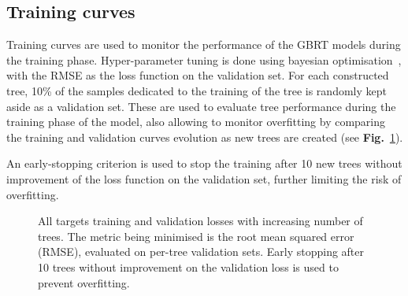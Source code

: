 \subsection{Training curves}
Training curves are used to monitor the performance of the GBRT models during the training phase. Hyper-parameter tuning is done using bayesian optimisation~\cite{Akiba2019}, with the RMSE as the loss function on the validation set. For each constructed tree, 10\% of the samples dedicated to the training of the tree is randomly kept aside as a validation set. These are used to evaluate tree performance during the training phase of the model, also allowing to monitor overfitting by comparing the training and validation curves evolution as new trees are created (see \textbf{Fig.}~\ref{fig:all_losses_curves}). 

An early-stopping criterion is used to stop the training after 10 new trees without improvement of the loss function on the validation set, further limiting the risk of overfitting.
\begin{figure}[ht]
\centering
{}
\caption{All targets training and validation losses with increasing number of trees. The metric being minimised is  the root mean squared error (RMSE), evaluated on per-tree validation sets. Early stopping after 10 trees without improvement on the validation loss is used to prevent overfitting.}
\label{fig:all_losses_curves}       %
\end{figure}


